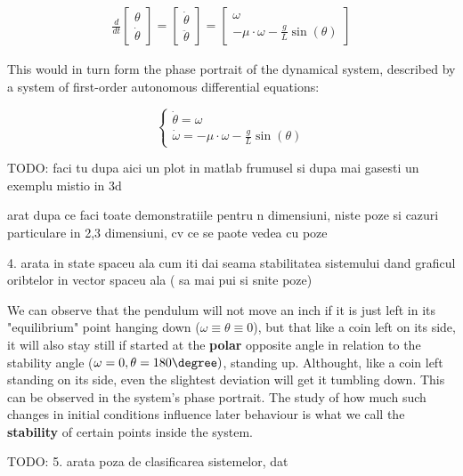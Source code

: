 \begin{align}
\frac{d}{dt}
\begin{bmatrix}
  \theta \\
  \dot{\theta}
\end{bmatrix} =
\begin{bmatrix}
  \dot{\theta} \\
  \ddot{\theta}
\end{bmatrix} =
\begin{bmatrix}
  \omega \\
  -\mu \cdot \omega - \frac{g}{L}\sin(\theta)
\end{bmatrix}
\end{align}

This would in turn form the phase portrait of the dynamical system, described by a system of first-order autonomous differential equations:

\[
\begin{cases}
  \dot{\theta}  = \omega \\
  \dot{\omega} = -\mu \cdot \omega - \frac{g}{L}\sin(\theta)
\end{cases}
\]

\par
TODO: faci tu dupa aici un plot in matlab frumusel
si dupa mai gasesti un exemplu mistio in 3d

arat dupa ce faci toate demonstratiile pentru n dimensiuni, niste poze si cazuri particulare in 2,3 dimensiuni, cv ce se paote vedea cu poze

4. arata in state spaceu ala cum iti dai seama stabilitatea sistemului dand graficul oribtelor in vector spaceu ala ( sa mai pui si snite poze)

We can observe that the pendulum will not move an inch if it is just left in its "equilibrium" point hanging down ($\omega \equiv \theta \equiv 0$), but that like a coin left on its side, it will also stay still if started at the \textbf{polar} opposite angle in relation to the stability angle ($\omega =0 , \theta = 180 \degree)$, standing up.
Althought, like a coin left standing on its side, even the slightest deviation will get it tumbling down. This can be observed in the system's phase portrait. The study of how much such changes in initial conditions influence later behaviour is what we call the \textbf{stability} of certain points inside the system.

TODO:
5. arata poza de clasificarea sistemelor, dat \\